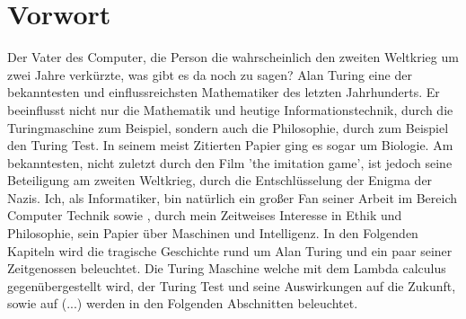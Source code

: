 \section{Vorwort}
Der Vater des Computer, die Person die wahrscheinlich den zweiten Weltkrieg um zwei Jahre verkürzte, was gibt es da noch zu sagen? Alan Turing eine der bekanntesten und einflussreichsten Mathematiker des letzten Jahrhunderts. Er beeinflusst nicht nur die Mathematik und heutige Informationstechnik, durch die Turingmaschine zum Beispiel, sondern auch die Philosophie, durch zum Beispiel den Turing Test. In seinem meist Zitierten Papier ging es sogar um Biologie. Am bekanntesten, nicht zuletzt durch den Film 'the imitation game', ist jedoch seine Beteiligung am zweiten Weltkrieg, durch die Entschlüsselung der Enigma der Nazis. Ich, als Informatiker, bin natürlich ein großer Fan seiner Arbeit im Bereich Computer Technik sowie , durch mein Zeitweises Interesse in Ethik und Philosophie, sein Papier über Maschinen und Intelligenz. In den Folgenden Kapiteln wird die tragische Geschichte rund um Alan Turing und ein paar seiner Zeitgenossen beleuchtet. Die Turing Maschine welche mit dem Lambda calculus gegenübergestellt wird, der Turing Test und seine Auswirkungen auf die Zukunft, sowie auf (...) werden in den Folgenden Abschnitten beleuchtet.